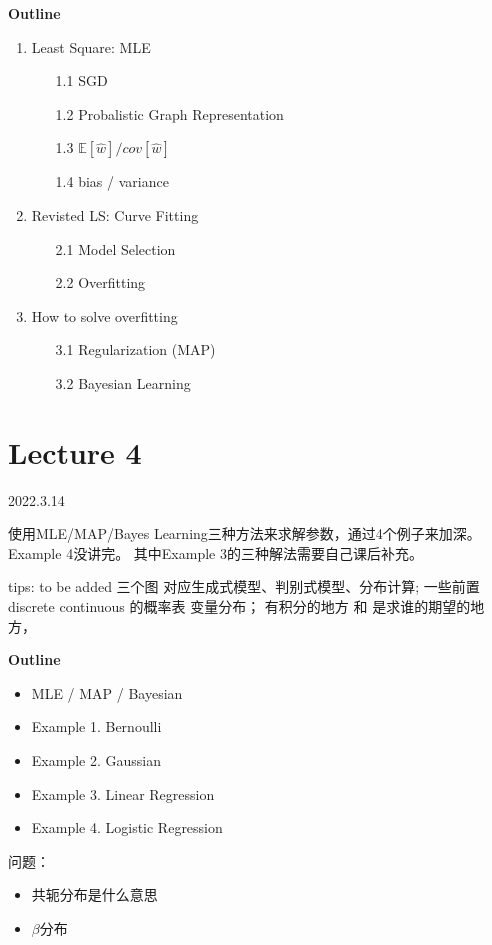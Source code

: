 \documentclass[UTF8]{ctexart}
\numberwithin{equation}{section}
\begin{document}
\textbf{Outline}
\begin{enumerate}
    \item Least Square: MLE 
    \begin{enumerate}
        \item[1.1] SGD
        \item[1.2] Probalistic Graph Representation
        \item[1.3] $ \mathbb{E}[\hat w] / cov[\hat w] $
        \item[1.4] bias / variance
    \end{enumerate}
    
    \item Revisted LS: Curve Fitting
    \begin{enumerate}
        \item[2.1] Model Selection
        \item[2.2] Overfitting
    \end{enumerate}
    \item How to solve overfitting
    \begin{enumerate}
        \item[3.1] Regularization (MAP)
        \item[3.2] Bayesian Learning
    \end{enumerate}
\end{enumerate}

\newpage
\section{Lecture 4}
2022.3.14

使用MLE/MAP/Bayes Learning三种方法来求解参数，通过4个例子来加深。Example 4没讲完。
其中Example 3的三种解法需要自己课后补充。

tips: to be added
三个图 对应生成式模型、判别式模型、分布计算;
一些前置 discrete continuous 的概率表 变量分布；
有积分的地方 和 是求谁的期望的地方，


\textbf{Outline}
\begin{itemize}
    \item MLE / MAP / Bayesian
    \item Example 1. Bernoulli
    \item Example 2. Gaussian
    \item Example 3. Linear Regression
    \item Example 4. Logistic Regression
\end{itemize}
问题：
\begin{itemize}
    \item 共轭分布是什么意思
    \item $\beta$分布
\end{itemize}
\end{document}
